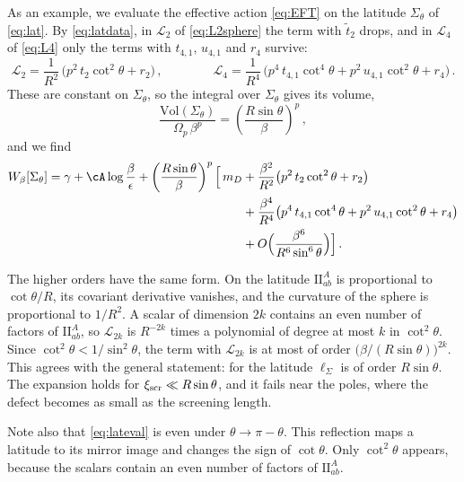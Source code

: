 \documentclass[a4paper,11pt]{article}
\newcommand{\II}{\mathrm{I\!I}}
\newcommand{\xiscr}{\xi_{\rm scr}}
\begin{document}
As an example, we evaluate the effective action \eqref{eq:EFT} on the latitude $\Sigma_\theta$ of \eqref{eq:lat}. By \eqref{eq:latdata}, in $\mathcal{L}_2$ of \eqref{eq:L2sphere} the term with $\tilde t_2$ drops, and in $\mathcal{L}_4$ of \eqref{eq:L4} only the terms with $t_{4,1}$, $u_{4,1}$ and $r_4$ survive:
	\begin{equation}\label{eq:lateval4}
		\mathcal{L}_2=\frac{1}{R^2}\,\bigl(p^2\,t_2\cot^2\theta+r_2\bigr)\, ,\qquad\qquad
		\mathcal{L}_4=\frac{1}{R^4}\,\bigl(p^4\,t_{4,1}\cot^4\theta+p^2\,u_{4,1}\cot^2\theta+r_4\bigr)\, .
	\end{equation}
	These are constant on $\Sigma_\theta$, so the integral over $\Sigma_\theta$ gives its volume,
\begin{equation}
	\frac{\mathrm{Vol}(\Sigma_\theta)}{\Omega_p\,\beta^p}=\left(\frac{R\sin\theta}{\beta}\right)^{p}\, ,
\end{equation}
and we find
\begin{equation}\label{eq:lateval}
	\begin{aligned}
		W_\beta[\Sigma_\theta]
		=\gamma+\cA\log\frac{\beta}{\epsilon}
		+\left(\frac{R\sin\theta}{\beta}\right)^{p}\Bigl[\,m_D&+\frac{\beta^2}{R^2}\bigl(p^2\,t_2\cot^2\theta+r_2\bigr)\\
		&+\frac{\beta^4}{R^4}\bigl(p^4\,t_{4,1}\cot^4\theta+p^2\,u_{4,1}\cot^2\theta+r_4\bigr)\\ & +O\Bigl(\frac{\beta^6}{R^6\sin^6\theta}\Bigr)\Bigr]\, .
	\end{aligned}
\end{equation}

The higher orders have the same form. On the latitude $\II^A_{ab}$ is proportional to $\cot\theta/R$, its covariant derivative vanishes, and the curvature of the sphere is proportional to $1/R^2$. A scalar of dimension $2k$ contains an even number of factors of $\II^A_{ab}$, so $\mathcal{L}_{2k}$ is $R^{-2k}$ times a polynomial of degree at most $k$ in $\cot^2\theta$. Since $\cot^2\theta<1/\sin^2\theta$, the term with $\mathcal{L}_{2k}$ is at most of order $\bigl(\beta/(R\sin\theta)\bigr)^{2k}$. This agrees with the general statement: for the latitude $\ell_\Sigma$ is of order $R\sin\theta$. The expansion holds for $\xiscr\ll R\sin\theta$, and it fails near the poles, where the defect becomes as small as the screening length.

Note also that \eqref{eq:lateval} is even under $\theta\to\pi-\theta$. This reflection maps a latitude to its mirror image and changes the sign of $\cot\theta$. Only $\cot^2\theta$ appears, because the scalars contain an even number of factors of $\II^A_{ab}$.
\end{document}
